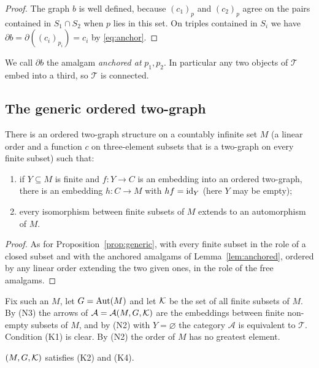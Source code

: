 \begin{proof}
The graph $b$ is well defined, because $(c_1)_p$ and $(c_2)_p$ agree on the
pairs contained in $S_1\cap S_2$ when $p$ lies in this set. On triples
contained in $S_i$ we have $\partial b=\partial((c_i)_{p_i})=c_i$ by
\eqref{eq:anchor}.
\end{proof}

We call $\partial b$ the amalgam \emph{anchored at} $p_1,p_2$. In particular
any two objects of $\mathcal T$ embed into a third, so $\mathcal T$ is
connected.

\subsection{The generic ordered two-graph}

\begin{proposition}\label{prop:generic2}
There is an ordered two-graph structure on a countably infinite set $M$
\textup{(}a linear order and a function $c$ on three-element subsets that is a
two-graph on every finite subset\textup{)} such that:
\begin{enumerate}
\item[\textup{(N2)}] if $Y\subseteq M$ is finite and $f\colon Y\to C$ is an
 embedding into an ordered two-graph, there is an embedding $h\colon C\to M$
 with $hf=\mathrm{id}_Y$ \textup{(}here $Y$ may be empty\textup{)};
\item[\textup{(N3)}] every isomorphism between finite subsets of $M$ extends to an
 automorphism of $M$.
\end{enumerate}
\end{proposition}

\begin{proof}
As for Proposition~\ref{prop:generic}, with every finite subset in the role
of a closed subset and with the anchored amalgams of Lemma~\ref{lem:anchored},
ordered by any linear order extending the two given ones, in the role of the
free amalgams.
\end{proof}

Fix such an $M$, let $G=\operatorname{Aut}(M)$ and let $\mathcal{K}$ be the set of all finite subsets
of $M$. By (N3) the arrows of $\mathcal A=\mathcal A(M,G,\mathcal{K})$ are the embeddings
between finite non-empty subsets of $M$, and by (N2) with $Y=\varnothing$ the
category $\mathcal A$ is equivalent to $\mathcal T$. Condition (K1) is clear.
By (N2) the order of $M$ has no greatest element.

\begin{lemma}\label{lem:K24two}
$(M,G,\mathcal{K})$ satisfies \textup{(K2)} and \textup{(K4)}.
\end{lemma}

